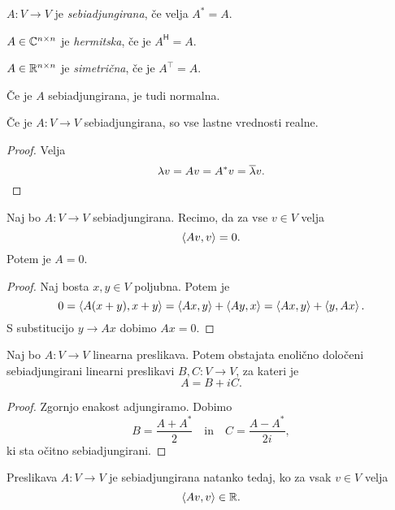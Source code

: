 \documentclass[12pt, a4paper]{article}
\begin{document}
\begin{definicija}
$A\colon V\to V$ je \emph{sebiadjungirana}, če velja $A^*=A$.
\end{definicija}

\begin{definicija}
$A\in\mathbb{C}^{n\times n}$ je \emph{hermitska}, če je $A^\mathsf{H}=A$.
\end{definicija}

\begin{definicija}
$A\in\mathbb{R}^{n\times n}$ je \emph{simetrična}, če je $A^\top=A$.
\end{definicija}

\begin{opomba}
Če je $A$ sebiadjungirana, je tudi normalna.
\end{opomba}

\begin{trditev}
Če je $A\colon V\to V$ sebiadjungirana, so vse lastne vrednosti realne.
\end{trditev}

\begin{proof}
Velja
\[
\lambda v=Av=A^*v=\overline{\lambda}v.\qedhere
\]
\end{proof}

\begin{trditev}\label{td:sadj}
Naj bo $A\colon V\to V$ sebiadjungirana. Recimo, da za vse $v\in V$ velja
\[
\left\langle Av,v\right\rangle=0.
\]
Potem je $A=0$.
\end{trditev}

\begin{proof}
Naj bosta $x,y\in V$ poljubna. Potem je
\[
0=\left\langle A(x+y),x+y\right\rangle=\left\langle Ax,y\right\rangle+\left\langle Ay,x\right\rangle=\left\langle Ax,y\right\rangle+\left\langle y,Ax\right\rangle.
\]
S substitucijo $y\to Ax$ dobimo $Ax=0$.
\end{proof}

\begin{trditev}
Naj bo $A\colon V\to V$ linearna preslikava. Potem obstajata enolično določeni sebiadjungirani linearni preslikavi $B,C\colon V\to V$, za kateri je
\[
A=B+iC.
\]
\end{trditev}

\begin{proof}
Zgornjo enakost adjungiramo. Dobimo
\[
B=\frac{A+A^*}{2}\quad\text{in}\quad C=\frac{A-A^*}{2i},
\]
ki sta očitno sebiadjungirani.
\end{proof}

\begin{trditev}
Preslikava $A\colon V\to V$ je sebiadjungirana natanko tedaj, ko za vsak $v\in V$ velja
\[
\left\langle Av,v\right\rangle\in\mathbb{R}.
\]
\end{trditev}
\end{document}
